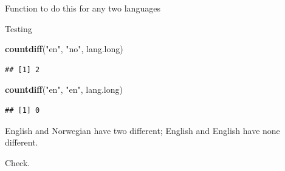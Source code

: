 \documentclass[ignorenonframetext,]{beamer}
\newenvironment{Shaded}{\begin{snugshade}}{\end{snugshade}}
\newcommand{\CommentTok}[1]{\textcolor[rgb]{0.56,0.35,0.01}{\textit{#1}}}
\newcommand{\ControlFlowTok}[1]{\textcolor[rgb]{0.13,0.29,0.53}{\textbf{#1}}}
\newcommand{\DataTypeTok}[1]{\textcolor[rgb]{0.13,0.29,0.53}{#1}}
\newcommand{\DecValTok}[1]{\textcolor[rgb]{0.00,0.00,0.81}{#1}}
\newcommand{\FloatTok}[1]{\textcolor[rgb]{0.00,0.00,0.81}{#1}}
\newcommand{\KeywordTok}[1]{\textcolor[rgb]{0.13,0.29,0.53}{\textbf{#1}}}
\newcommand{\NormalTok}[1]{#1}
\newcommand{\OperatorTok}[1]{\textcolor[rgb]{0.81,0.36,0.00}{\textbf{#1}}}
\newcommand{\StringTok}[1]{\textcolor[rgb]{0.31,0.60,0.02}{#1}}
\begin{document}
\begin{frame}[fragile]{Function to do this for any two languages}
\protect\hypertarget{function-to-do-this-for-any-two-languages}{}

\begin{Shaded}
\end{Shaded}

\end{frame}

\begin{frame}[fragile]{Testing}
\protect\hypertarget{testing}{}

\begin{Shaded}
\begin{Highlighting}[]
\KeywordTok{countdiff}\NormalTok{(}\StringTok{"en"}\NormalTok{, }\StringTok{"no"}\NormalTok{, lang.long)}
\end{Highlighting}
\end{Shaded}

\begin{verbatim}
## [1] 2
\end{verbatim}

\begin{Shaded}
\begin{Highlighting}[]
\KeywordTok{countdiff}\NormalTok{(}\StringTok{"en"}\NormalTok{, }\StringTok{"en"}\NormalTok{, lang.long)}
\end{Highlighting}
\end{Shaded}

\begin{verbatim}
## [1] 0
\end{verbatim}

English and Norwegian have two different; English and English have none
different.

Check.

\end{frame}
\end{document}
